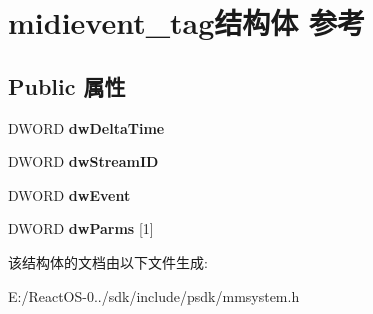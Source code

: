 \hypertarget{structmidievent__tag}{}\section{midievent\+\_\+tag结构体 参考}
\label{structmidievent__tag}
\subsection*{Public 属性}
\begin{DoxyCompactItemize}
\item 
\mbox{\label{structmidievent__tag_a06d413162bcaaa8b6522954ce40f6891}} 
D\+W\+O\+RD {\bfseries dw\+Delta\+Time}
\item 
\mbox{\label{structmidievent__tag_ae8bb14ff9ba7154664bdfdca6a3727e9}} 
D\+W\+O\+RD {\bfseries dw\+Stream\+ID}
\item 
\mbox{\label{structmidievent__tag_a9eb2aaeef80cd196ddb135c69cbe35ce}} 
D\+W\+O\+RD {\bfseries dw\+Event}
\item 
\mbox{\label{structmidievent__tag_a9befd9512e6cac4dc38bd272ae3c675d}} 
D\+W\+O\+RD {\bfseries dw\+Parms} \mbox{[}1\mbox{]}
\end{DoxyCompactItemize}


该结构体的文档由以下文件生成\+:\begin{DoxyCompactItemize}
\item 
E\+:/\+React\+O\+S-\/0../sdk/include/psdk/mmsystem.\+h\end{DoxyCompactItemize}

